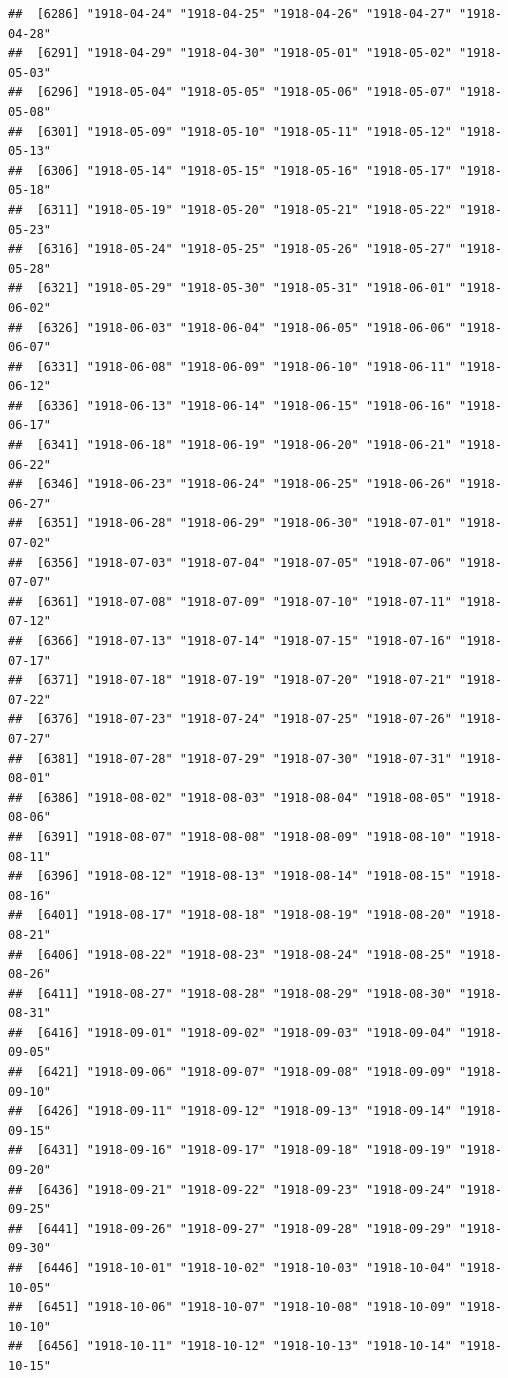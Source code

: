 \documentclass{article}\usepackage[]{graphicx}\usepackage[]{color}
\makeatletter
\newenvironment{kframe}{%
 \def\at@end@of@kframe{}%
 \ifinner\ifhmode%
  \def\at@end@of@kframe{\end{minipage}}%
  \begin{minipage}{\columnwidth}%
 \fi\fi%
 \def\FrameCommand##1{\hskip\@totalleftmargin \hskip-\fboxsep
 \colorbox{shadecolor}{##1}\hskip-\fboxsep
     \hskip-\linewidth \hskip-\@totalleftmargin \hskip\columnwidth}%
 \MakeFramed {\advance\hsize-\width
   \@totalleftmargin\z@ \linewidth\hsize
   \@setminipage}}%
 {\par\unskip\endMakeFramed%
 \at@end@of@kframe}
\newenvironment{knitrout}{}{} %
\makeatother
\begin{document}
\begin{description}
\begin{knitrout}
\begin{kframe}
\begin{verbatim}
##  [6286] "1918-04-24" "1918-04-25" "1918-04-26" "1918-04-27" "1918-04-28"
##  [6291] "1918-04-29" "1918-04-30" "1918-05-01" "1918-05-02" "1918-05-03"
##  [6296] "1918-05-04" "1918-05-05" "1918-05-06" "1918-05-07" "1918-05-08"
##  [6301] "1918-05-09" "1918-05-10" "1918-05-11" "1918-05-12" "1918-05-13"
##  [6306] "1918-05-14" "1918-05-15" "1918-05-16" "1918-05-17" "1918-05-18"
##  [6311] "1918-05-19" "1918-05-20" "1918-05-21" "1918-05-22" "1918-05-23"
##  [6316] "1918-05-24" "1918-05-25" "1918-05-26" "1918-05-27" "1918-05-28"
##  [6321] "1918-05-29" "1918-05-30" "1918-05-31" "1918-06-01" "1918-06-02"
##  [6326] "1918-06-03" "1918-06-04" "1918-06-05" "1918-06-06" "1918-06-07"
##  [6331] "1918-06-08" "1918-06-09" "1918-06-10" "1918-06-11" "1918-06-12"
##  [6336] "1918-06-13" "1918-06-14" "1918-06-15" "1918-06-16" "1918-06-17"
##  [6341] "1918-06-18" "1918-06-19" "1918-06-20" "1918-06-21" "1918-06-22"
##  [6346] "1918-06-23" "1918-06-24" "1918-06-25" "1918-06-26" "1918-06-27"
##  [6351] "1918-06-28" "1918-06-29" "1918-06-30" "1918-07-01" "1918-07-02"
##  [6356] "1918-07-03" "1918-07-04" "1918-07-05" "1918-07-06" "1918-07-07"
##  [6361] "1918-07-08" "1918-07-09" "1918-07-10" "1918-07-11" "1918-07-12"
##  [6366] "1918-07-13" "1918-07-14" "1918-07-15" "1918-07-16" "1918-07-17"
##  [6371] "1918-07-18" "1918-07-19" "1918-07-20" "1918-07-21" "1918-07-22"
##  [6376] "1918-07-23" "1918-07-24" "1918-07-25" "1918-07-26" "1918-07-27"
##  [6381] "1918-07-28" "1918-07-29" "1918-07-30" "1918-07-31" "1918-08-01"
##  [6386] "1918-08-02" "1918-08-03" "1918-08-04" "1918-08-05" "1918-08-06"
##  [6391] "1918-08-07" "1918-08-08" "1918-08-09" "1918-08-10" "1918-08-11"
##  [6396] "1918-08-12" "1918-08-13" "1918-08-14" "1918-08-15" "1918-08-16"
##  [6401] "1918-08-17" "1918-08-18" "1918-08-19" "1918-08-20" "1918-08-21"
##  [6406] "1918-08-22" "1918-08-23" "1918-08-24" "1918-08-25" "1918-08-26"
##  [6411] "1918-08-27" "1918-08-28" "1918-08-29" "1918-08-30" "1918-08-31"
##  [6416] "1918-09-01" "1918-09-02" "1918-09-03" "1918-09-04" "1918-09-05"
##  [6421] "1918-09-06" "1918-09-07" "1918-09-08" "1918-09-09" "1918-09-10"
##  [6426] "1918-09-11" "1918-09-12" "1918-09-13" "1918-09-14" "1918-09-15"
##  [6431] "1918-09-16" "1918-09-17" "1918-09-18" "1918-09-19" "1918-09-20"
##  [6436] "1918-09-21" "1918-09-22" "1918-09-23" "1918-09-24" "1918-09-25"
##  [6441] "1918-09-26" "1918-09-27" "1918-09-28" "1918-09-29" "1918-09-30"
##  [6446] "1918-10-01" "1918-10-02" "1918-10-03" "1918-10-04" "1918-10-05"
##  [6451] "1918-10-06" "1918-10-07" "1918-10-08" "1918-10-09" "1918-10-10"
##  [6456] "1918-10-11" "1918-10-12" "1918-10-13" "1918-10-14" "1918-10-15"

\end{verbatim}
\end{kframe}
\end{knitrout}
\end{description}
\end{document}
